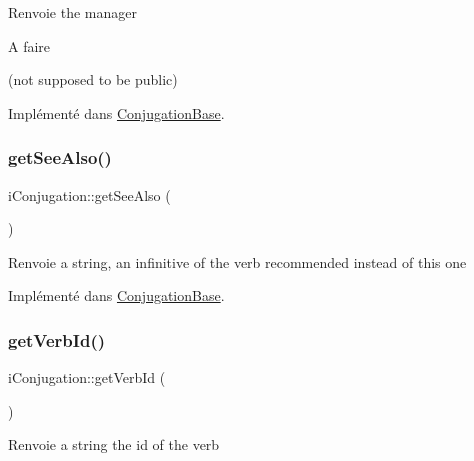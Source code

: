 \begin{DoxyReturn}{Renvoie}
the manager
\end{DoxyReturn}
\begin{DoxyRefDesc}{A faire}
\item[\hyperlink{todo__todo000001}{A faire}](not supposed to be public) \end{DoxyRefDesc}


Implémenté dans \hyperlink{classConjugationBase_aab285eff4995c059a3aa0abec778a390}{Conjugation\+Base}.

\hypertarget{interfaceiConjugation_a58e61c703ad1f0d76db1535235e530a0}{}\label{interfaceiConjugation_a58e61c703ad1f0d76db1535235e530a0} 
\subsubsection{\texorpdfstring{get\+See\+Also()}{getSeeAlso()}}
{\footnotesize\ttfamily i\+Conjugation\+::get\+See\+Also (\begin{DoxyParamCaption}{ }\end{DoxyParamCaption})}

\begin{DoxyReturn}{Renvoie}
a string, an infinitive of the verb recommended instead of this one 
\end{DoxyReturn}


Implémenté dans \hyperlink{classConjugationBase_a76d7179c150a4e32fb410d5af9bc388c}{Conjugation\+Base}.

\hypertarget{interfaceiConjugation_aa34e7af66125d28af4f485529d456a74}{}\label{interfaceiConjugation_aa34e7af66125d28af4f485529d456a74} 
\subsubsection{\texorpdfstring{get\+Verb\+Id()}{getVerbId()}}
{\footnotesize\ttfamily i\+Conjugation\+::get\+Verb\+Id (\begin{DoxyParamCaption}{ }\end{DoxyParamCaption})}

\begin{DoxyReturn}{Renvoie}
a string the id of the verb 
\end{DoxyReturn}


